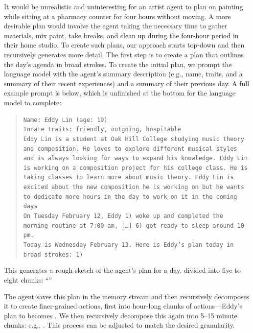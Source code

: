 It would be unrealistic and uninteresting for an artist agent to plan on painting while sitting at a pharmacy counter for four hours without moving. A more desirable plan would involve the agent taking the necessary time to gather materials, mix paint, take breaks, and clean up during the four-hour period in their home studio. To create such plans, our approach starts top-down and then recursively generates more detail. The first step is to create a plan that outlines the day's agenda in broad strokes. To create the initial plan, we prompt the language model with the agent's summary description (e.g., name, traits, and a summary of their recent experiences) and a summary of their previous day. A full example prompt is below, which is unfinished at the bottom for the language model to complete:
\begin{quote}
    {\small
    \texttt{Name: Eddy Lin (age: 19) \\
        Innate traits: friendly, outgoing, hospitable\\
        Eddy Lin is a student at Oak Hill College studying music theory and composition. He loves to explore different musical styles and is always looking for ways to expand his knowledge. Eddy Lin is working on a composition project for his college class. He is taking classes to learn more about music theory. Eddy Lin is excited about the new composition he is working on but he wants to dedicate more hours in the day to work on it in the coming days\\
        On Tuesday February 12, Eddy 1) woke up and completed the morning routine at 7:00 am, […] 6) got ready to sleep around 10 pm.\\
        Today is Wednesday February 13. Here is Eddy’s plan today in broad strokes: 1)
    }
    }
\end{quote}
This generates a rough sketch of the agent's plan for a day, divided into five to eight chunks: “” 

The agent saves this plan in the memory stream and then recursively decomposes it to create finer-grained actions, first into hour-long chunks of actions---Eddy’s plan to  becomes . We then recursively decompose this again into 5--15 minute chunks: e.g., . This process can be adjusted to match the desired granularity. 

